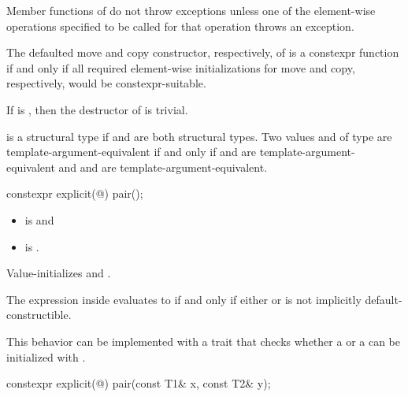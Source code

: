 \pnum
Member functions of  do not throw exceptions unless one of
the element-wise operations specified to be called for that operation
throws an exception.

\pnum
The defaulted move and copy constructor, respectively, of 
is a constexpr function if and only if all required element-wise
initializations for move and copy, respectively,
would be constexpr-suitable.

\pnum
If 
is , then the destructor of  is trivial.

\pnum
{} is a structural type
if  and  are both structural types.
Two values  and  of type 
are template-argument-equivalent if and only if
 and  are template-argument-equivalent and
 and  are template-argument-equivalent.

%
\begin{itemdecl}
constexpr explicit(@\seebelow@) pair();
\end{itemdecl}

\begin{itemdescr}
\pnum
\constraints
\begin{itemize}
\item {} is  and
\item {} is .
\end{itemize}

\pnum
\effects
Value-initializes  and .

\pnum
\remarks
The expression inside  evaluates to 
if and only if either  or
 is not implicitly default-constructible.
\begin{note}
This behavior can be implemented with a trait that checks
whether a  or a 
can be initialized with \tcode{\{\}}.
\end{note}
\end{itemdescr}

%
\begin{itemdecl}
constexpr explicit(@\seebelow@) pair(const T1& x, const T2& y);
\end{itemdecl}

